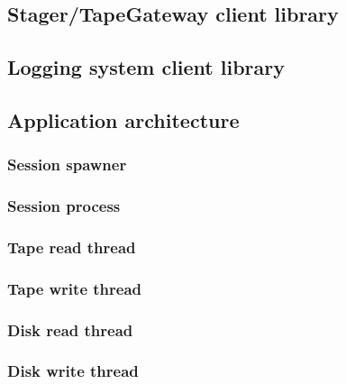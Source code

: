 \subsection{Stager/TapeGateway client library}

\subsection{Logging system client library}

\subsection{Application architecture}

\subsubsection{Session spawner}

\subsubsection{Session process}

\subsubsection{Tape read thread}

\subsubsection{Tape write thread}

\subsubsection{Disk read thread}

\subsubsection{Disk write thread}



